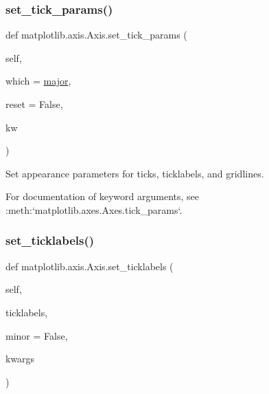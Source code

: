 \mbox{\label{classmatplotlib_1_1axis_1_1Axis_ac6e610348fecce29a3fe66a1af2fb05f}} 
\subsubsection{\texorpdfstring{set\+\_\+tick\+\_\+params()}{set\_tick\_params()}}
{\footnotesize\ttfamily def matplotlib.\+axis.\+Axis.\+set\+\_\+tick\+\_\+params (\begin{DoxyParamCaption}\item[{}]{self,  }\item[{}]{which = {\ttfamily \textquotesingle{}\hyperlink{classmatplotlib_1_1axis_1_1Axis_a349fa77c014c5e44f472634075372df2}{major}\textquotesingle{}},  }\item[{}]{reset = {\ttfamily False},  }\item[{}]{kw }\end{DoxyParamCaption})}

\begin{DoxyVerb}Set appearance parameters for ticks, ticklabels, and gridlines.

For documentation of keyword arguments, see
:meth:`matplotlib.axes.Axes.tick_params`.
\end{DoxyVerb}
 \mbox{\label{classmatplotlib_1_1axis_1_1Axis_ae329fbb2fee5ba8d3274da71194baa18}} 
\subsubsection{\texorpdfstring{set\+\_\+ticklabels()}{set\_ticklabels()}}
{\footnotesize\ttfamily def matplotlib.\+axis.\+Axis.\+set\+\_\+ticklabels (\begin{DoxyParamCaption}\item[{}]{self,  }\item[{}]{ticklabels,  }\item[{}]{minor = {\ttfamily False},  }\item[{}]{kwargs }\end{DoxyParamCaption})}

